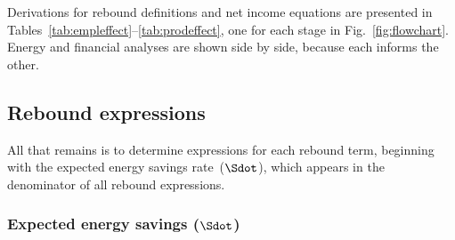 Derivations for rebound definitions and net income equations
are presented in Tables~\ref{tab:empleffect}--\ref{tab:prodeffect},
one for each stage in Fig.~\ref{fig:flowchart}.
Energy and financial analyses are shown side by side, because
each informs the other.


















\subsection{Rebound expressions}
\label{sec:rebound_expressions}

All that remains is to determine expressions for each rebound term, 
beginning with the expected energy savings rate~($\Sdot$), which
appears in the denominator of all rebound expressions.


\subsubsection{Expected energy savings ($\Sdot$)} 
\label{sec:Sdot}


